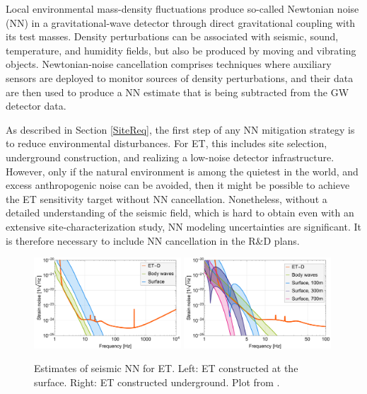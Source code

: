 \FloatBarrier
\label{sec:mitigateNN}
Local environmental mass-density fluctuations produce so-called Newtonian noise (NN) in a gravitational-wave detector through direct gravitational coupling with its test masses. Density perturbations can be associated with seismic, sound, temperature, and humidity fields, but also be produced by moving and vibrating objects. Newtonian-noise cancellation comprises techniques where auxiliary sensors are deployed to monitor sources of density perturbations, and their data are then used to produce a NN estimate that is being subtracted from the GW detector data.

As described in Section \ref{SiteReq}, the first step of any NN mitigation strategy is to reduce environmental disturbances. For ET, this includes site selection, underground construction, and realizing a low-noise detector infrastructure. However, only if the natural environment is among the quietest in the world, and excess anthropogenic noise can be avoided, then it might be possible to achieve the ET sensitivity target without NN cancellation. Nonetheless, without a detailed understanding of the seismic field, which is hard to obtain even with an extensive site-characterization study, NN modeling uncertainties are significant. It is therefore necessary to include NN cancellation in the R\&D plans.
\begin{figure}[t!]
    \centering
    \includegraphics[width=0.49\textwidth]{SiteInfra/SiteRequirements/NewtonianNoise/NewtonianNoiseFigures/Seismic_Surf.pdf}
    \includegraphics[width=0.49\textwidth]{SiteInfra/SiteRequirements/NewtonianNoise/NewtonianNoiseFigures/Seismic_UG.pdf}
    \caption{Estimates of seismic NN for ET. Left: ET constructed at the surface. Right: ET constructed underground. Plot from \cite{BaHa2019}.}
    \label{fig:NNestimates}
\end{figure}

